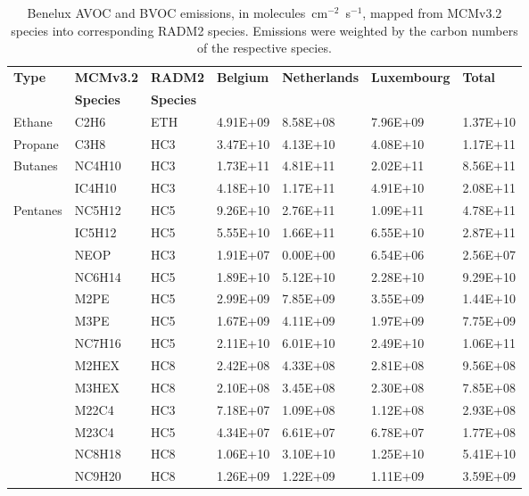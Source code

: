 \footnotesize
\begin{longtable}{lllllll}
	\caption{Benelux AVOC and BVOC emissions, in molecules~cm$^{-2}$~s$^{-1}$, mapped from MCMv3.2 species into corresponding RADM2 species. Emissions were weighted by the carbon numbers of the respective species.}\\%
	\hline \hline
	\multirow{2}{*}{\textbf{Type}} & \textbf{MCMv3.2} & \textbf{RADM2} & \multirow{2}{*}{\textbf{Belgium}} & \multirow{2}{*}{\textbf{Netherlands}} & \multirow{2}{*}{\textbf{Luxembourg}} & \multirow{2}{*}{\textbf{Total}} \\
 & \textbf{Species} & \textbf{Species} & & & & \\
	\endhead
	\hline
	Ethane & C2H6 & ETH & 4.91E+09 & 8.58E+08 & 7.96E+09 & 1.37E+10 \\
	\hline Propane & C3H8 & HC3 & 3.47E+10 & 4.13E+10 & 4.08E+10 & 1.17E+11 \\ \hline
	\multirow{2}{*}{Butanes} & NC4H10 & HC3 & 1.73E+11 & 4.81E+11 & 2.02E+11 & 8.56E+11 \\
	 & IC4H10 & HC3 & 4.18E+10 & 1.17E+11 & 4.91E+10 & 2.08E+11 \\
	\hline \multirow{3}{*}{Pentanes} & NC5H12 & HC5 & 9.26E+10 & 2.76E+11 & 1.09E+11 & 4.78E+11 \\
	 & IC5H12 & HC5 & 5.55E+10 & 1.66E+11 & 6.55E+10 & 2.87E+11 \\
	 & NEOP & HC3 & 1.91E+07 & 0.00E+00 & 6.54E+06 & 2.56E+07 \\
	\hline \parbox[t]{2mm}{} & NC6H14 & HC5 & 1.89E+10 & 5.12E+10 & 2.28E+10 & 9.29E+10 \\
	 & M2PE & HC5 & 2.99E+09 & 7.85E+09 & 3.55E+09 & 1.44E+10 \\
	 & M3PE & HC5 & 1.67E+09 & 4.11E+09 & 1.97E+09 & 7.75E+09 \\
	 & NC7H16 & HC5 & 2.11E+10 & 6.01E+10 & 2.49E+10 & 1.06E+11 \\
	 & M2HEX & HC8 & 2.42E+08 & 4.33E+08 & 2.81E+08 & 9.56E+08 \\
	 & M3HEX & HC8 & 2.10E+08 & 3.45E+08 & 2.30E+08 & 7.85E+08 \\
	 & M22C4 & HC3 & 7.18E+07 & 1.09E+08 & 1.12E+08 & 2.93E+08 \\
	 & M23C4 & HC5 & 4.34E+07 & 6.61E+07 & 6.78E+07 & 1.77E+08 \\
	 & NC8H18 & HC8 & 1.06E+10 & 3.10E+10 & 1.25E+10 & 5.41E+10 \\
	 & NC9H20 & HC8 & 1.26E+09 & 1.22E+09 & 1.11E+09 & 3.59E+09 \\

\end{longtable}
